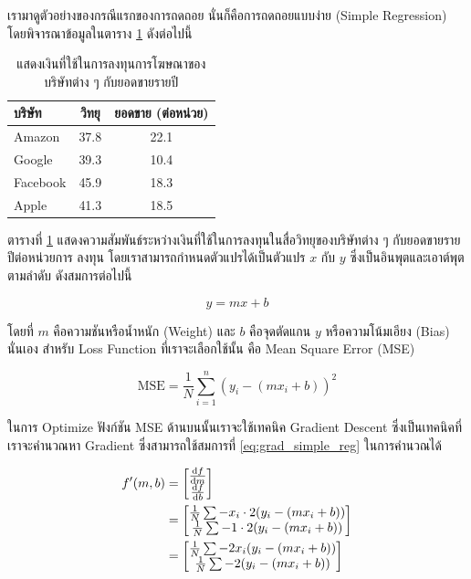 เรามาดูตัวอย่างของกรณีแรกของการถดถอย นั่นก็คือการถดถอยแบบง่าย (Simple Regression) โดยพิจารณาข้อมูลในตาราง 
\ref{tab:simple_reg_data} ดังต่อไปนี้ 

\begin{table}[htbp]
    \centering
    \caption{แสดงเงินที่ใช้ในการลงทุนการโฆษณาของบริษัทต่าง ๆ กับยอดขายรายปี}
    \label{tab:simple_reg_data}
    \begin{tabular}{lcc}\toprule
    \textbf{บริษัท} &\textbf{วิทยุ} &\textbf{ยอดขาย (ต่อหน่วย)} \\\midrule
    Amazon &37.8 &22.1 \\
    Google &39.3 &10.4 \\
    Facebook &45.9 &18.3 \\
    Apple &41.3 &18.5 \\
    \bottomrule
    \end{tabular}
\end{table}

ตารางที่ \ref{tab:simple_reg_data} แสดงความสัมพันธ์ระหว่างเงินที่ใช้ในการลงทุนในสื่อวิทยุของบริษัทต่าง ๆ กับยอดขายรายปีต่อหน่วยการ%
ลงทุน โดยเราสามารถกำหนดตัวแปรได้เป็นตัวแปร $x$ กับ $y$ ซึ่งเป็นอินพุตและเอาต์พุตตามลำดับ ดังสมการต่อไปนี้

\begin{equation}
    y = mx + b
\end{equation}

\noindent โดยที่ $m$ คือความชันหรือน้ำหนัก (Weight) และ $b$ คือจุดตัดแกน $y$ หรือความโน้มเอียง (Bias) นั่นเอง สำหรับ Loss 
Function ที่เราจะเลือกใช้นั้น คือ Mean Square Error (MSE)

\begin{equation}
    \text{MSE} = \frac{1}{N} \sum_{i=1}^{n} (y_i - (m x_i + b))^2
\end{equation}

ในการ Optimize ฟังก์ชัน MSE ด้านบนนั้นเราจะใช้เทคนิค Gradient Descent ซึ่งเป็นเทคนิคที่เราจะคำนวณหา Gradient ซึ่งสามารถใช้สมการที่
\ref{eq:grad_simple_reg} ในการคำนวณได้

\begin{align}\label{eq:grad_simple_reg}
    f'(m,b) &=
      \begin{bmatrix}
        \dv{f}{m} \\
        \dv{f}{b} \\
      \end{bmatrix} \\
    &=
      \begin{bmatrix}
        \frac{1}{N} \sum -x_i \cdot 2(y_i - (mx_i + b)) \\
        \frac{1}{N} \sum -1 \cdot 2(y_i - (mx_i + b)) \\
      \end{bmatrix} \\
    &=
      \begin{bmatrix}
         \frac{1}{N} \sum -2x_i(y_i - (mx_i + b)) \\
         \frac{1}{N} \sum -2(y_i - (mx_i + b)) \\
      \end{bmatrix}
\end{align}

